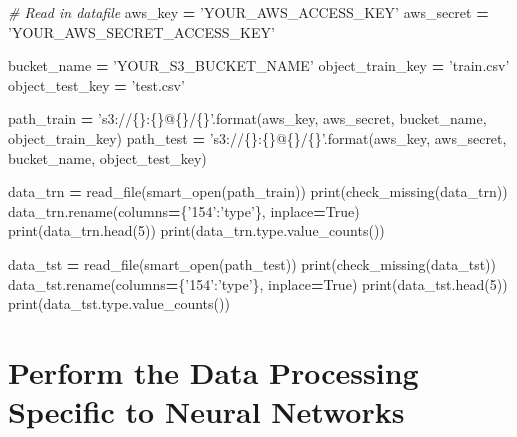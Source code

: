 \documentclass[]{book}
\newenvironment{Shaded}{\begin{snugshade}}{\end{snugshade}}
\newcommand{\DecValTok}[1]{\textcolor[rgb]{0.00,0.00,0.81}{#1}}
\newcommand{\SpecialCharTok}[1]{\textcolor[rgb]{0.00,0.00,0.00}{#1}}
\newcommand{\StringTok}[1]{\textcolor[rgb]{0.31,0.60,0.02}{#1}}
\newcommand{\CommentTok}[1]{\textcolor[rgb]{0.56,0.35,0.01}{\textit{#1}}}
\newcommand{\VariableTok}[1]{\textcolor[rgb]{0.00,0.00,0.00}{#1}}
\newcommand{\OperatorTok}[1]{\textcolor[rgb]{0.81,0.36,0.00}{\textbf{#1}}}
\newcommand{\BuiltInTok}[1]{#1}
\newcommand{\NormalTok}[1]{#1}
\begin{document}
\begin{Shaded}
\begin{Highlighting}[]
\CommentTok{# Read in datafile}
\NormalTok{aws_key }\OperatorTok{=} \StringTok{'YOUR_AWS_ACCESS_KEY'}
\NormalTok{aws_secret }\OperatorTok{=} \StringTok{'YOUR_AWS_SECRET_ACCESS_KEY'}

\NormalTok{bucket_name }\OperatorTok{=} \StringTok{'YOUR_S3_BUCKET_NAME'}
\NormalTok{object_train_key }\OperatorTok{=} \StringTok{'train.csv'}
\NormalTok{object_test_key }\OperatorTok{=} \StringTok{'test.csv'}

\NormalTok{path_train }\OperatorTok{=} \StringTok{'s3://}\SpecialCharTok{\{\}}\StringTok{:}\SpecialCharTok{\{\}}\StringTok{@}\SpecialCharTok{\{\}}\StringTok{/}\SpecialCharTok{\{\}}\StringTok{'}\NormalTok{.}\BuiltInTok{format}\NormalTok{(aws_key, aws_secret, bucket_name, object_train_key)}
\NormalTok{path_test }\OperatorTok{=} \StringTok{'s3://}\SpecialCharTok{\{\}}\StringTok{:}\SpecialCharTok{\{\}}\StringTok{@}\SpecialCharTok{\{\}}\StringTok{/}\SpecialCharTok{\{\}}\StringTok{'}\NormalTok{.}\BuiltInTok{format}\NormalTok{(aws_key, aws_secret, bucket_name, object_test_key)}

\NormalTok{data_trn }\OperatorTok{=}\NormalTok{ read_file(smart_open(path_train))}
\BuiltInTok{print}\NormalTok{(check_missing(data_trn))}
\NormalTok{data_trn.rename(columns}\OperatorTok{=}\NormalTok{\{}\StringTok{'154'}\NormalTok{:}\StringTok{'type'}\NormalTok{\}, inplace}\OperatorTok{=}\VariableTok{True}\NormalTok{)}
\BuiltInTok{print}\NormalTok{(data_trn.head(}\DecValTok{5}\NormalTok{))}
\BuiltInTok{print}\NormalTok{(data_trn.}\BuiltInTok{type}\NormalTok{.value_counts())}

\NormalTok{data_tst }\OperatorTok{=}\NormalTok{ read_file(smart_open(path_test))}
\BuiltInTok{print}\NormalTok{(check_missing(data_tst))}
\NormalTok{data_tst.rename(columns}\OperatorTok{=}\NormalTok{\{}\StringTok{'154'}\NormalTok{:}\StringTok{'type'}\NormalTok{\}, inplace}\OperatorTok{=}\VariableTok{True}\NormalTok{)}
\BuiltInTok{print}\NormalTok{(data_tst.head(}\DecValTok{5}\NormalTok{))}
\BuiltInTok{print}\NormalTok{(data_tst.}\BuiltInTok{type}\NormalTok{.value_counts())}
\end{Highlighting}
\end{Shaded}

\hypertarget{perform-the-data-processing-specific-to-neural-networks}{%
\section{Perform the Data Processing Specific to Neural Networks}\label{perform-the-data-processing-specific-to-neural-networks}}
\end{document}
